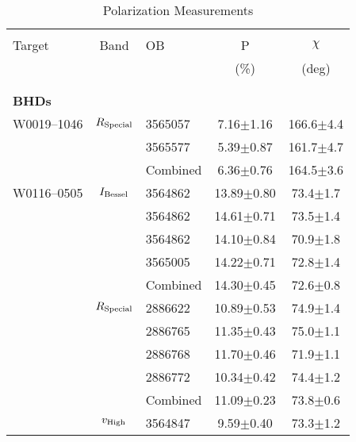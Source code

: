 \begin{table}
    \caption{\label{tab:pols} Polarization Measurements}
    \begin{tabular}{lclcc}
        \hline \hline\\
        Target & Band & OB &  P   & $\chi$ \\
               &      &    & (\%) &  (deg) \\
        \\
        \hline\\
        {\bf{BHDs}}\\
        W0019--1046  & $R_{\rm Special}$ & 3565057   & \phantom{0}7.16$\pm$1.16 &           166.6$\pm$4.4 \\
                     &                   & 3565577   & \phantom{0}5.39$\pm$0.87 &           161.7$\pm$4.7 \\
                     &                   & Combined  & \phantom{0}6.36$\pm$0.76 &           164.5$\pm$3.6 \\
        W0116--0505  & $I_{\rm Bessel}$  & 3564862   &           13.89$\pm$0.80 & \phantom{0}73.4$\pm$1.7 \\
                     &                   & 3564862   &           14.61$\pm$0.71 & \phantom{0}73.5$\pm$1.4 \\
                     &                   & 3564862   &           14.10$\pm$0.84 & \phantom{0}70.9$\pm$1.8 \\
                     &                   & 3565005   &           14.22$\pm$0.71 & \phantom{0}72.8$\pm$1.4 \\
                     &                   & Combined  &           14.30$\pm$0.45 & \phantom{0}72.6$\pm$0.8 \\
                     & $R_{\rm Special}$ & 2886622   &           10.89$\pm$0.53 & \phantom{0}74.9$\pm$1.4 \\
                     &                   & 2886765   &           11.35$\pm$0.43 & \phantom{0}75.0$\pm$1.1 \\
                     &                   & 2886768   &           11.70$\pm$0.46 & \phantom{0}71.9$\pm$1.1 \\
                     &                   & 2886772   &           10.34$\pm$0.42 & \phantom{0}74.4$\pm$1.2 \\
                     &                   & Combined  &           11.09$\pm$0.23 & \phantom{0}73.8$\pm$0.6 \\
                     & $v_{\rm High}$    & 3564847   & \phantom{0}9.59$\pm$0.40 & \phantom{0}73.3$\pm$1.2 \\

\end{tabular}
\end{table}

